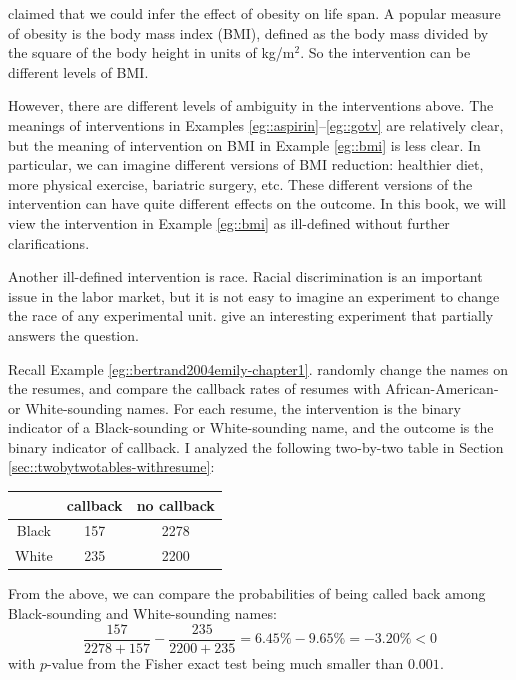 \begin{example}\label{eg::bmi}
\citet{pearl2018does} claimed that we could infer the effect of obesity on life span. 
A popular measure of obesity is the body mass index (BMI), defined as the body mass divided by the square of the body height in units of kg/m$^2$. So the intervention can be different levels of BMI. 
\end{example} 


However, there are different levels of ambiguity in the interventions above. The meanings of interventions in Examples \ref{eg::aspirin}--\ref{eg::gotv} are relatively clear, but the meaning of intervention on BMI in Example \ref{eg::bmi} is less clear. In particular, we can imagine different versions of BMI reduction: healthier diet, more physical exercise, bariatric surgery, etc. These different versions of the intervention can have quite different effects on the outcome. In this book, we will view the intervention in Example \ref{eg::bmi} as ill-defined without further clarifications.

 

Another ill-defined intervention is race. Racial discrimination is an important issue in the labor market, but it is not easy to imagine an experiment to change the race of any experimental unit. \citet{bertrand2004emily} give an interesting experiment that partially answers the question. 

\begin{example}\label{eg::race}
Recall Example \ref{eg::bertrand2004emily-chapter1}. 
\citet{bertrand2004emily} randomly change the names on the resumes, and compare the callback rates of resumes with African-American- or White-sounding names. For each resume, the intervention is the binary indicator of a Black-sounding or White-sounding name, and the outcome is the binary indicator of callback. I analyzed the following two-by-two table in Section \ref{sec::twobytwotables-withresume}: 

\begin{center} 
\begin{tabular}{ccc}
\hline 
 &   callback & no  callback \\
 \hline 
Black  & 157 & 2278\\
White   & 235 & 2200\\
\hline 
\end{tabular}
\end{center}

From the above, we can compare the probabilities of being called back among  Black-sounding and White-sounding names:
$$
\frac{157}{2278 + 157} - \frac{235}{  2200 + 235 } = 6.45\% - 9.65\% = - 3.20\% < 0
$$
with $p$-value from the Fisher exact test being much smaller than $0.001$. 
\end{example}

